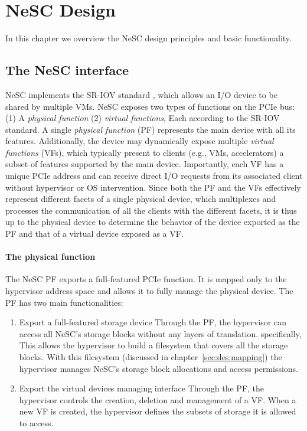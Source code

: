 \chapter{NeSC Design}
\label{chap:design}

In this chapter we overview the NeSC design principles and basic functionality. 

\section{The NeSC interface}
NeSC implements the SR-IOV standard \cite{pcisigiov}, which allows an I/O device to be shared by multiple VMs.
NeSC exposes two types of functions on the PCIe bus: (1) A \emph{physical function} (2) \emph{ virtual functions}, Each according to the SR-IOV standard.
A single \emph{physical function} (PF) represents the main device with all its features. Additionally, the device may dynamically expose multiple \emph{virtual functions} (VFs), which typically present to clients (e.g., VMs, accelerators) a subset of features supported by the main device. Importantly, each VF has a unique PCIe address and can receive direct I/O requests from its associated client without hypervisor or OS intervention.
%
Since both the PF and the VFs effectively represent different facets of a single physical device, which multiplexes and processes the communication of all the clients with the different facets,
it is thus up to the physical device to determine the behavior of the device exported as the PF and that of a virtual device exposed as a VF.

\subsubsection*{The physical function}
The NeSC PF exports a full-featured PCIe function. It is mapped only to the hypervisor address space and allows it to fully manage the physical  device.
The PF has two main functionalities:
  
\begin{enumerate}
\item Export a full-featured storage device \quad
  Through the PF, the hypervisor can access all NeSC's storage blocks without any layers of 
  translation. specifically, This allows the hypervisor to build a filesystem that covers all
  the storage blocks. With this filesystem (discussed in chapter~\ref{sec:des:mapping}) the
  hypervisor manages NeSC's storage block allocations and access permissions.

\item Export the virtual devices managing interface \quad
  Through the PF, the hypervisor controls the creation, deletion and management of a VF.
  When a new VF is created, the hypervisor defines the subsets of storage it is allowed to access.

\end{enumerate}

